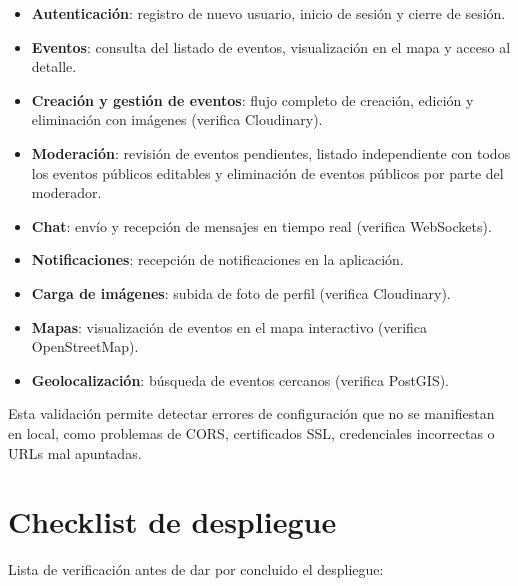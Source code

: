 \begin{itemize}
    \item \textbf{Autenticación}: registro de nuevo usuario, inicio de sesión y cierre de sesión.
    \item \textbf{Eventos}: consulta del listado de eventos, visualización en el mapa y acceso al detalle.
    \item \textbf{Creación y gestión de eventos}: flujo completo de creación, edición y eliminación con imágenes (verifica Cloudinary).
    \item \textbf{Moderación}: revisión de eventos pendientes, listado independiente con todos los eventos públicos editables y eliminación de eventos públicos por parte del moderador.
    \item \textbf{Chat}: envío y recepción de mensajes en tiempo real (verifica WebSockets).
    \item \textbf{Notificaciones}: recepción de notificaciones en la aplicación.
    \item \textbf{Carga de imágenes}: subida de foto de perfil (verifica Cloudinary).
    \item \textbf{Mapas}: visualización de eventos en el mapa interactivo (verifica OpenStreetMap).
    \item \textbf{Geolocalización}: búsqueda de eventos cercanos (verifica PostGIS).
\end{itemize}

Esta validación permite detectar errores de configuración que no se manifiestan en local, como problemas de CORS, certificados SSL, credenciales incorrectas o URLs mal apuntadas.

\section{Checklist de despliegue}

Lista de verificación antes de dar por concluido el despliegue:

